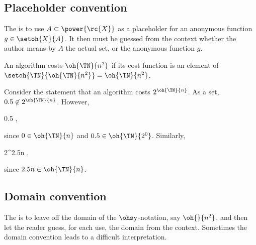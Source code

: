 \documentclass[b5paper, english, oneside]{memoir}
\begin{document}
\subsection{Placeholder convention}

\begin{definition}
The  is to use $A \subset \power{\rc{X}}$ as a placeholder for an anonymous function $g \in \setoh{X}{A}$. It then must be guessed from the context whether the author means by $A$ the actual set, or the anonymous function $g$. 
\end{definition}

\begin{example}
An algorithm costs $\oh{\TN}{n^2}$ if its cost function is an element of $\setoh{\TN}{\oh{\TN}{n^2}} = \oh{\TN}{n^2}$.
\end{example}

\begin{example}
Consider the statement that an algorithm costs $2^{\oh{\TN}{n}}$. As a set, $0.5 \not\in 2^{\oh{\TN}{n}}$. However,
\begin{eqs}
0.5 \in {},
\end{eqs}
since $0 \in \oh{\TN}{n}$ and $0.5 \in \oh{\TN}{2^0}$. Similarly,
\begin{eqs}
2^{2.5n} \in {},
\end{eqs}
since $2.5n \in \oh{\TN}{n}$. 
\end{example}











\subsection{Domain convention}

\begin{definition}
The  is to leave off the domain of the $\ohsy$-notation, say $\oh{}{n^2}$, and then let the reader guess, for each use, the domain from the context. Sometimes the domain convention leads to a difficult interpretation. 
\end{definition}
\end{document}
